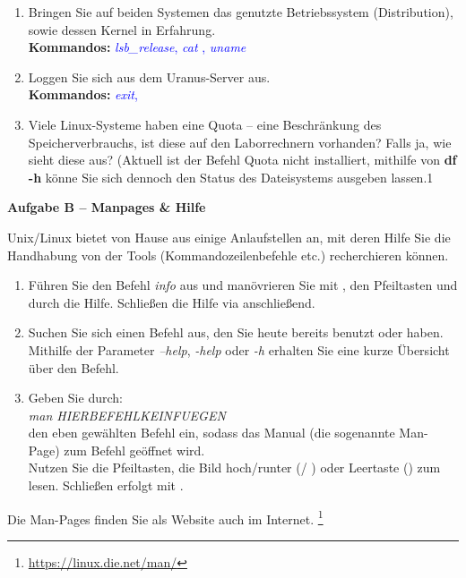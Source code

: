 \documentclass[paper=a4,fontsize=11pt]{scrartcl}%
\numberwithin{equation}{section}
\begin{document}
\begin{enumerate}
\begin{enumerate}
          \item Bringen Sie auf beiden Systemen das genutzte Betriebssystem (Distribution), sowie dessen Kernel in Erfahrung.\\
          \textbf{Kommandos:} \textcolor{blue}{\emph{lsb\_release}, \emph{cat }, \emph{uname}}
          \item Loggen Sie sich aus dem Uranus-Server aus.\\
          \textbf{Kommandos:} \textcolor{blue}{\emph{exit}, }
          \item Viele Linux-Systeme haben eine Quota -- eine Beschränkung des Speicherverbrauchs, ist diese auf den Laborrechnern vorhanden? Falls ja, wie sieht diese aus? (Aktuell ist der Befehl Quota nicht installiert, mithilfe von \textbf{df -h} könne Sie sich dennoch den Status des Dateisystems ausgeben lassen.1
        \end{enumerate}
\end{enumerate}

\begin{center}\Large{\textbf{Aufgabe B -- Manpages \& Hilfe}}\end{center}\vskip0.25in
Unix/Linux bietet von Hause aus einige Anlaufstellen an, mit deren Hilfe Sie die Handhabung von der Tools (Kommandozeilenbefehle etc.) recherchieren können.
\begin{enumerate}
	\item Führen Sie den Befehl \emph{info} aus und manövrieren Sie mit \keys{\tab}, den Pfeiltasten und \keys{\return} durch die Hilfe. Schließen die Hilfe via  anschließend.
	\item Suchen Sie sich einen Befehl aus, den Sie heute bereits benutzt oder haben. Mithilfe der Parameter \emph{--help}, \emph{-help} oder \emph{-h} erhalten Sie eine kurze Übersicht über den Befehl.
    \item Geben Sie durch: \\
    		\emph{man HIERBEFEHLKEINFUEGEN}\\
		den eben gewählten Befehl ein, sodass das Manual (die sogenannte Man-Page) zum Befehl geöffnet wird.\\
		 Nutzen Sie die Pfeiltasten, die Bild hoch/runter (/ ) oder Leertaste (\keys{\Space}) zum lesen. Schließen erfolgt mit .
\end{enumerate}
Die Man-Pages finden Sie als Website auch im Internet. \footnote{\url{https://linux.die.net/man/}}
\end{document}
